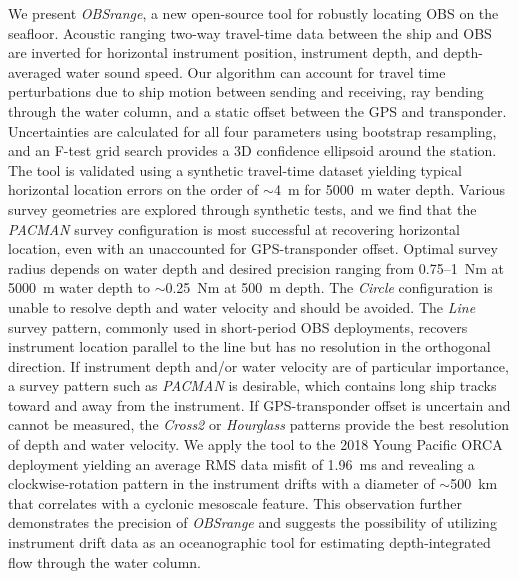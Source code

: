 We present \textit{OBSrange}, a new open-source tool for robustly locating OBS on the seafloor. Acoustic ranging two-way travel-time data between the ship and OBS are inverted for horizontal instrument position, instrument depth, and depth-averaged water sound speed. Our algorithm can account for travel time perturbations due to ship motion between sending and receiving, ray bending through the water column, and a static offset between the GPS and transponder. Uncertainties are calculated for all four parameters using bootstrap resampling, and an F-test grid search provides a 3D confidence ellipsoid around the station. The tool is validated using a synthetic travel-time dataset yielding typical horizontal location errors on the order of $\sim$4~m for 5000~m water depth. Various survey geometries are explored through synthetic tests, and we find that the \textit{PACMAN} survey configuration is most successful at recovering horizontal location, even with an unaccounted for GPS-transponder offset. Optimal survey radius depends on water depth and desired precision ranging from 0.75--1~Nm at 5000~m water depth to $\sim$0.25~Nm at 500~m depth. The \textit{Circle} configuration is unable to resolve depth and water velocity and should be avoided. The \textit{Line} survey pattern, commonly used in short-period OBS deployments, recovers instrument location parallel to the line but has no resolution in the orthogonal direction. If instrument depth and/or water velocity are of particular importance, a survey pattern such as \textit{PACMAN} is desirable, which contains long ship tracks toward and away from the instrument. If GPS-transponder offset is uncertain and cannot be measured, the \textit{Cross2} or \textit{Hourglass} patterns provide the best resolution of depth and water velocity. We apply the tool to the 2018 Young Pacific ORCA deployment yielding an average RMS data misfit of 1.96~ms and revealing a clockwise-rotation pattern in the instrument drifts with a diameter of $\sim$500~km that correlates with a cyclonic mesoscale feature. This observation further demonstrates the precision of \textit{OBSrange} and suggests the possibility of utilizing instrument drift data as an oceanographic tool for estimating depth-integrated flow through the water column.